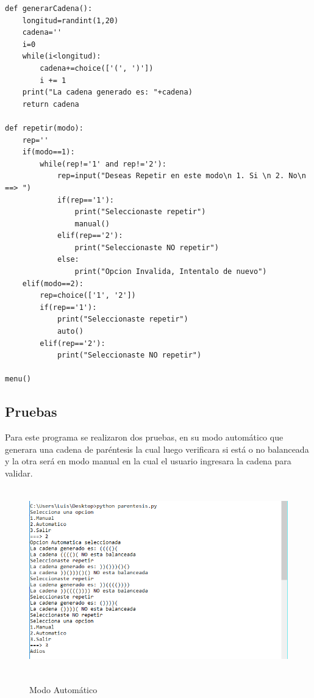 \documentclass[12pt]{article}
\begin{document}
\begin{lstlisting}[frame=single]
def generarCadena():
    longitud=randint(1,20)
    cadena=''
    i=0
    while(i<longitud):
	    cadena+=choice(['(', ')'])
	    i += 1
    print("La cadena generado es: "+cadena)
    return cadena

def repetir(modo):
	rep=''
	if(modo==1):
		while(rep!='1' and rep!='2'):
			rep=input("Deseas Repetir en este modo\n 1. Si \n 2. No\n ==> ")
			if(rep=='1'):
				print("Seleccionaste repetir")
				manual()
			elif(rep=='2'):
				print("Seleccionaste NO repetir")
			else:
				print("Opcion Invalida, Intentalo de nuevo")
	elif(modo==2):
		rep=choice(['1', '2'])
		if(rep=='1'):
			print("Seleccionaste repetir")
			auto()
		elif(rep=='2'):
			print("Seleccionaste NO repetir")

menu()

\end{lstlisting}

\subsection{Pruebas}

Para este programa se realizaron dos pruebas, en su modo automático que generara una cadena de paréntesis la cual luego verificara si está o no balanceada y la otra será en modo manual en la cual el usuario ingresara la cadena para validar. \\

\begin{figure}[H]
\begin{center}
\includegraphics[width=\textwidth, height=8cm]{auto_parentesis}
\label{ }
\caption{Modo Automático}
\end{center}
\end{figure}
\end{document}
